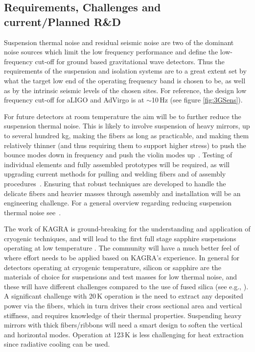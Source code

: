 \begin{samepage}
\section{Requirements, Challenges and current/Planned R\&D}
Suspension thermal noise and residual seismic noise are two of the dominant noise sources which limit the low frequency performance and define the low-frequency cut-off for ground based gravitational wave detectors. Thus the requirements of the suspension and isolation systems are to a great extent set by what the target low end of the operating frequency band is chosen to be, as well as by the intrinsic seismic levels of the chosen sites.
For reference, the design low frequency cut-off for \ac{aLIGO} and \ac{AdVirgo} is at $\sim$10\,Hz (see figure \ref{fig:3GSens}).

\end{samepage} %


 For future detectors at room temperature the aim will be to further reduce the suspension thermal noise. This is likely to involve suspension of heavy mirrors, up to several hundred kg, making the fibers as long as practicable, and making them relatively thinner (and thus requiring them to support higher stress) to push the bounce modes down in frequency and push the violin modes up~\cite{Heptonstall:2014, Bell:2014,aisa:2016advanced, Tokmakov:2012, Amico:2002_monolithic}.  Testing of individual elements and fully assembled prototypes will be required, as will upgrading current methods for pulling and welding fibers and of assembly procedures~\cite{Hammond:2014,Travasso:2018}. Ensuring that robust techniques are developed to handle the delicate fibers and heavier masses through assembly and installation will be an engineering challenge. For a general overview regarding reducing suspension thermal noise see~\cite{Hammond:2014, Hammond:2012}.

The work of \ac{KAGRA} is ground-breaking for the understanding and application of cryogenic techniques, and will lead to the first full stage sapphire suspensions operating at low temperature \cite{Kumar:2016_KAGRA}. The community will have a much better feel of where effort needs to be applied based on \ac{KAGRA}'s experience.
In general for detectors operating at cryogenic temperature, silicon or sapphire are the materials of choice for suspensions and test masses for low thermal noise, and these will have different challenges compared to the use of fused silica (see e.g., \cite{Cumming:2014Silicon, nawrodt:2013,Haughian:2016, Alshourbagy:2006_thermoelastic, Alshourbagy:2006,amico:2004, Cumming:2014Silicon, Alshourbagy:2005}). A significant challenge with 20\,K operation is the need to extract any deposited power via the fibers, which in turn drives their cross sectional area and vertical stiffness, and requires knowledge of their thermal properties. Suspending heavy mirrors with thick fibers/ribbons will need a smart design to soften the vertical and horizontal modes. Operation at 123\,K is less challenging for heat extraction since radiative cooling can be used.

